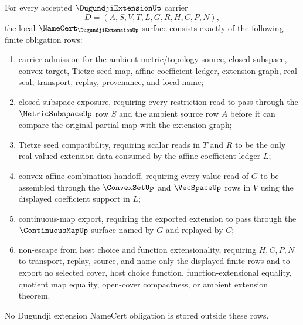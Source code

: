 \begin{theorem}
\label{thm:dugundji-extension-namecert-obligations}
For every accepted $\DugundjiExtensionUp$ carrier
$$
D=(A,S,V,T,L,G,R,H,C,P,N),
$$
the local $\NameCert_{\DugundjiExtensionUp}$ surface consists exactly of the following finite obligation rows:
\begin{enumerate}
\item carrier admission for the ambient metric/topology source, closed subspace, convex target, Tietze seed map, affine-coefficient ledger, extension graph, real seal, transport, replay, provenance, and local name;
\item closed-subspace exposure, requiring every restriction read to pass through the $\MetricSubspaceUp$ row $S$ and the ambient source row $A$ before it can compare the original partial map with the extension graph;
\item Tietze seed compatibility, requiring scalar reads in $T$ and $R$ to be the only real-valued extension data consumed by the affine-coefficient ledger $L$;
\item convex affine-combination handoff, requiring every value read of $G$ to be assembled through the $\ConvexSetUp$ and $\VecSpaceUp$ rows in $V$ using the displayed coefficient support in $L$;
\item continuous-map export, requiring the exported extension to pass through the $\ContinuousMapUp$ surface named by $G$ and replayed by $C$;
\item non-escape from host choice and function extensionality, requiring $H,C,P,N$ to transport, replay, source, and name only the displayed finite rows and to export no selected cover, host choice function, function-extensional equality, quotient map equality, open-cover compactness, or ambient extension theorem.
\end{enumerate}
No Dugundji extension NameCert obligation is stored outside these rows.
\end{theorem}
